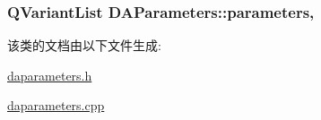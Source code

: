 \subsubsection[{\texorpdfstring{parameters}{parameters}}]{\setlength{\rightskip}{0pt plus 5cm}Q\+Variant\+List D\+A\+Parameters\+::parameters\hspace{0.3cm}{\ttfamily [read]}, {\ttfamily [write]}}\hypertarget{class_d_a_parameters_ab418da6f029448485c336c1cacdfacc7}{}\label{class_d_a_parameters_ab418da6f029448485c336c1cacdfacc7}


该类的文档由以下文件生成\+:\begin{DoxyCompactItemize}
\item 
\hyperlink{daparameters_8h}{daparameters.\+h}\item 
\hyperlink{daparameters_8cpp}{daparameters.\+cpp}\end{DoxyCompactItemize}
